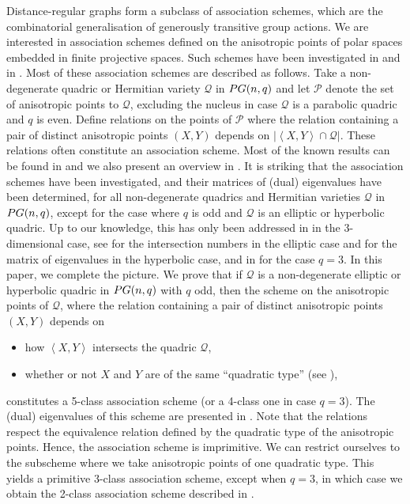 \documentclass[a4paper]{article}
\theoremstyle{definition}
\newcommand{\vspan}[1]{\left \langle #1 \right \rangle}
\newcommand{\pg}{\textnormal{PG}}
\newcommand{\pp}{\mathcal P}
\newcommand{\mq}{\mathcal Q}
\begin{document}
Distance-regular graphs form a subclass of association schemes, which are the combinatorial generalisation of generously transitive group actions.
We are interested in association schemes defined on the anisotropic points of polar spaces embedded in finite projective spaces.
Such schemes have been investigated in \cite[\S 12]{bcn} and in \cite{chakravarti71, wei83, brouwervanlint, bannaihaosong, bannaisonghaowei, vanhove20}.
Most of these association schemes are described as follows.
Take a non-degenerate quadric or Hermitian variety $\mq$ in $\pg(n,q)$ and let $\pp$ denote the set of anisotropic points to $\mq$, excluding the nucleus in case $\mq$ is a parabolic quadric and $q$ is even.
Define relations on the points of $\pp$ where the relation containing a pair of distinct anisotropic points $(X,Y)$ depends on $|\vspan{X,Y} \cap \mq|$.
These relations often constitute an association scheme.
Most of the known results can be found in \cite[\S 3.1]{brouwervanmaldeghem} and we also present an overview in .
It is striking that the association schemes have been investigated, and their matrices of (dual) eigenvalues have been determined, for all non-degenerate quadrics and Hermitian varieties $\mq$ in $\pg(n,q)$, except for the case where $q$ is odd and $\mq$ is an elliptic or hyperbolic quadric.
Up to our knowledge, this has only been addressed in \cite[\S 12.2]{bcn} in the 3-dimensional case, see \cite[p.\ 335]{FisherPenttilaPraegerRoyle} for the intersection numbers in the elliptic case and \cite[\S 3]{adriaensen2022stability} for the matrix of eigenvalues in the hyperbolic case, and in \cite[\S 3.1.3]{brouwervanmaldeghem} for the case $q=3$.
In this paper, we complete the picture.
We prove that if $\mq$ is a non-degenerate elliptic or hyperbolic quadric in $\pg(n,q)$ with $q$ odd, then the scheme on the anisotropic points of $\mq$, where the relation containing a pair of distinct anisotropic points $(X,Y)$ depends on
\begin{itemize}
 \item how $\vspan{X,Y}$ intersects the quadric $\mq$,
 \item whether or not $X$ and $Y$ are of the same ``quadratic type'' (see ),
\end{itemize}
constitutes a 5-class association scheme (or a 4-class one in case $q=3$).
The (dual) eigenvalues of this scheme are presented in .
Note that the relations respect the equivalence relation defined by the quadratic type of the anisotropic points.
Hence, the association scheme is imprimitive.
We can restrict ourselves to the subscheme where we take anisotropic points of one quadratic type.
This yields a primitive 3-class association scheme, except when $q=3$, in which case we obtain the 2-class association scheme described in \cite[\S 3.1.3]{brouwervanmaldeghem}.
\end{document}
